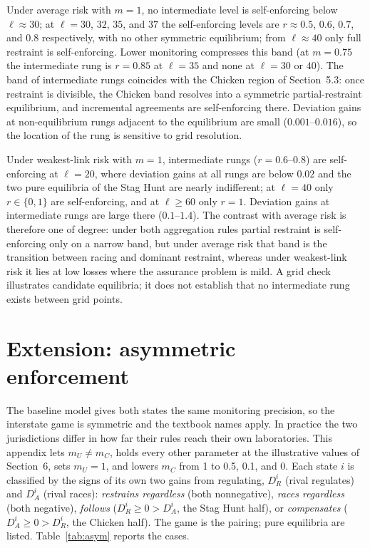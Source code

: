 \documentclass[11pt]{article}
\theoremstyle{plain}
\theoremstyle{definition}
\theoremstyle{remark}
\begin{document}
Under average risk with $m=1$, no intermediate level is self-enforcing below $\ell\approx30$; at $\ell=30$, $32$, $35$, and $37$ the self-enforcing levels are $r\approx0.5$, $0.6$, $0.7$, and $0.8$ respectively, with no other symmetric equilibrium; from $\ell\approx40$ only full restraint is self-enforcing. Lower monitoring compresses this band (at $m=0.75$ the intermediate rung is $r=0.85$ at $\ell=35$ and none at $\ell=30$ or $40$). The band of intermediate rungs coincides with the Chicken region of Section~5.3: once restraint is divisible, the Chicken band resolves into a symmetric partial-restraint equilibrium, and incremental agreements are self-enforcing there. Deviation gains at non-equilibrium rungs adjacent to the equilibrium are small ($0.001$--$0.016$), so the location of the rung is sensitive to grid resolution.

Under weakest-link risk with $m=1$, intermediate rungs ($r=0.6$--$0.8$) are self-enforcing at $\ell=20$, where deviation gains at all rungs are below $0.02$ and the two pure equilibria of the Stag Hunt are nearly indifferent; at $\ell=40$ only $r\in\{0,1\}$ are self-enforcing, and at $\ell\ge60$ only $r=1$. Deviation gains at intermediate rungs are large there ($0.1$--$1.4$). The contrast with average risk is therefore one of degree: under both aggregation rules partial restraint is self-enforcing only on a narrow band, but under average risk that band is the transition between racing and dominant restraint, whereas under weakest-link risk it lies at low losses where the assurance problem is mild. A grid check illustrates candidate equilibria; it does not establish that no intermediate rung exists between grid points.

\section{Extension: asymmetric enforcement}

The baseline model gives both states the same monitoring precision, so the interstate game is symmetric and the textbook names apply. In practice the two jurisdictions differ in how far their rules reach their own laboratories. This appendix lets $m_U\ne m_C$, holds every other parameter at the illustrative values of Section~6, sets $m_U=1$, and lowers $m_C$ from 1 to 0.5, 0.1, and 0. Each state $i$ is classified by the signs of its own two gains from regulating, $D^i_R$ (rival regulates) and $D^i_A$ (rival races): \emph{restrains regardless} (both nonnegative), \emph{races regardless} (both negative), \emph{follows} ($D^i_R\ge0>D^i_A$, the Stag Hunt half), or \emph{compensates} ($D^i_A\ge0>D^i_R$, the Chicken half). The game is the pairing; pure equilibria are listed. Table~\ref{tab:asym} reports the cases.
\end{document}
